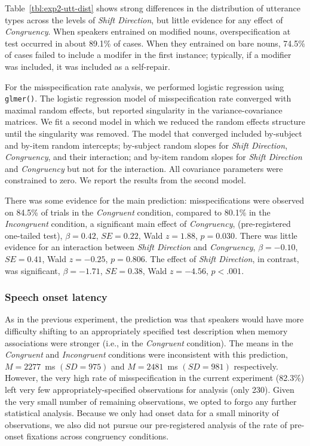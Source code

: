 \documentclass[natbib,doc,a4paper]{apa6}
\begin{document}
Table~\ref{tbl:exp2-utt-dist} shows strong differences in the distribution of utterance types across the levels of \emph{Shift Direction}, but little evidence for any effect of \emph{Congruency}.  When speakers entrained on modified nouns, overspecification at test occurred in about
89.1\%  
of cases. When they entrained on bare nouns, 
74.5\%
of cases failed to include a modifer in the first instance; typically, if a modifier was included, it was included as a self-repair.

For the misspecification rate analysis, we performed logistic regression using \texttt{glmer()}.  The logistic regression model of misspecification rate converged with maximal random effects, but reported singularity in the variance-covariance matrices. We fit a second model in which we reduced the random effects structure until the singularity was removed. The model that converged included by-subject and by-item random intercepts; by-subject random slopes for \emph{Shift Direction}, \emph{Congruency}, and their interaction; and by-item random slopes for \emph{Shift Direction} and \emph{Congruency} but not for the interaction. All covariance parameters were constrained to zero.  We report the results from the second model.

There was some evidence for the main prediction: misspecifications were observed on 
84.5\%
of trials in the \emph{Congruent} condition, compared to 
80.1\%
in the \emph{Incongruent} condition, a significant main effect of \emph{Congruency}, (pre-registered one-tailed test), 
\(\beta = 0.42\), \(SE = 0.22\), Wald \(z = 1.88\), \(p = 0.030\).
There was little evidence for an interaction between \emph{Shift Direction} and \emph{Congruency}, 
\(\beta = -0.10\), \(SE = 0.41\), Wald \(z = -0.25\), \(p = 0.806\).
The effect of \emph{Shift Direction}, in contrast, was significant,
\(\beta = -1.71\), \(SE = 0.38\), Wald \(z = -4.56\), \(p < .001\).

\subsubsection*{Speech onset latency}
\label{sec:org329af78}

As in the previous experiment, the prediction was that speakers would have more difficulty shifting to an appropriately specified test description when memory associations were stronger (i.e., in the \emph{Congruent} condition). 
The means in the \emph{Congruent} and \emph{Incongruent} conditions were inconsistent with this prediction,
\(M = 2277\)~ms \((SD = 975)\)
and 
\(M = 2481\)~ms \((SD = 981)\)
respectively. 
However, the very high rate of misspecification in the current experiment
(82.3\%)
left very few appropriately-specified observations for analysis 
(only 230).
Given the very small number of remaining observations, we opted to forgo any further statistical analysis. Because we only had onset data for a small minority of observations, we also did not pursue our pre-registered analysis of the rate of pre-onset fixations across congruency conditions.
\end{document}
